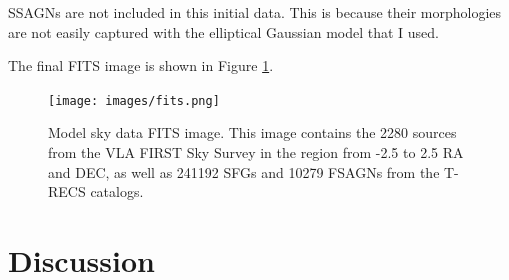 \documentclass{article}
\begin{document}
\begin{multicols*}{2}
SSAGNs are not included in this initial data. This is because their morphologies are not easily captured with the elliptical Gaussian model that I used.

The final FITS image is shown in Figure \ref{fig:fits}.

\begin{figure}
    \centering
    \texttt{[image: images/fits.png]}
    \caption{Model sky data FITS image. This image contains the 2280 sources from the VLA FIRST Sky Survey in the region from -2.5 to 2.5 RA and DEC, as well as 241192 SFGs and 10279 FSAGNs from the T-RECS catalogs.}
    \label{fig:fits}
\end{figure}

\section{Discussion}


\end{multicols*}
\end{document}
